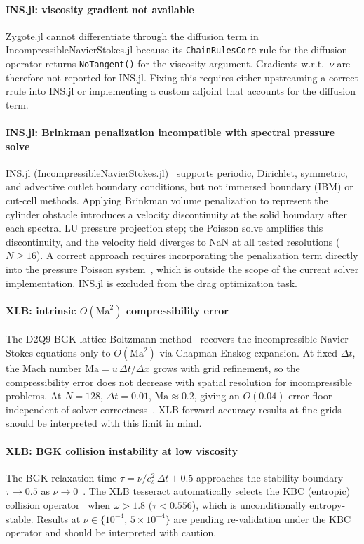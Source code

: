 \documentclass[11pt,a4paper]{article}
\begin{document}
\paragraph{INS.jl: viscosity gradient not available}
Zygote.jl cannot differentiate through the diffusion term in
IncompressibleNavierStokes.jl because its \texttt{ChainRulesCore} rule for
the diffusion operator returns \texttt{NoTangent()} for the viscosity
argument. Gradients w.r.t.\ $\nu$ are therefore not reported for INS.jl.
Fixing this requires either upstreaming a correct rrule into INS.jl or
implementing a custom adjoint that accounts for the diffusion term.

\paragraph{INS.jl: Brinkman penalization incompatible with spectral pressure solve}
INS.jl (IncompressibleNavierStokes.jl)~\cite{agdestein2024ins} supports periodic,
Dirichlet, symmetric, and advective outlet boundary conditions, but not
immersed boundary (IBM) or cut-cell methods. Applying Brinkman volume
penalization to represent the cylinder obstacle introduces a velocity
discontinuity at the solid boundary after each spectral LU pressure
projection step; the Poisson solve amplifies this discontinuity, and the
velocity field diverges to NaN at all tested resolutions ($N \geq 16$). A
correct approach requires incorporating the penalization term directly into
the pressure Poisson system~\cite{angot1999penalization}, which is outside
the scope of the current solver implementation. INS.jl is excluded from the
drag optimization task.

\paragraph{XLB: intrinsic $O(\mathrm{Ma}^2)$ compressibility error}
The D2Q9 BGK lattice Boltzmann method~\cite{qian1992lattice} recovers the
incompressible Navier-Stokes equations only to $O(\mathrm{Ma}^2)$ via
Chapman-Enskog expansion. At fixed $\Delta t$, the Mach number
$\mathrm{Ma} = u\,\Delta t / \Delta x$ grows with grid refinement, so the
compressibility error does not decrease with spatial resolution for
incompressible problems. At $N = 128$, $\Delta t = 0.01$,
$\mathrm{Ma} \approx 0.2$, giving an $O(0.04)$ error floor independent of
solver correctness~\cite{ataei2024xlb}. XLB forward accuracy results at
fine grids should be interpreted with this limit in mind.

\paragraph{XLB: BGK collision instability at low viscosity}
The BGK relaxation time $\tau = \nu/c_s^2\,\Delta t + 0.5$ approaches the
stability boundary $\tau \to 0.5$ as $\nu \to 0$~\cite{qian1992lattice}.
The XLB tesseract automatically selects the KBC (entropic) collision
operator~\cite{ataei2024xlb} when $\omega > 1.8$ ($\tau < 0.556$), which is
unconditionally entropy-stable.
Results at $\nu \in \{10^{-4},\, 5\times10^{-4}\}$ are pending re-validation
under the KBC operator and should be interpreted with caution.
\end{document}

